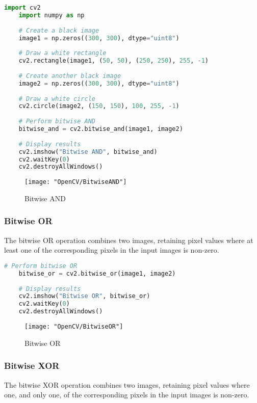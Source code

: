 \begin{lstlisting}[language=Python, caption=Bitwise AND]
	import cv2
	import numpy as np
	
	# Create a black image
	image1 = np.zeros((300, 300), dtype="uint8")
	
	# Draw a white rectangle
	cv2.rectangle(image1, (50, 50), (250, 250), 255, -1)
	
	# Create another black image
	image2 = np.zeros((300, 300), dtype="uint8")
	
	# Draw a white circle
	cv2.circle(image2, (150, 150), 100, 255, -1)
	
	# Perform bitwise AND
	bitwise_and = cv2.bitwise_and(image1, image2)
	
	# Display results
	cv2.imshow("Bitwise AND", bitwise_and)
	cv2.waitKey(0)
	cv2.destroyAllWindows()
\end{lstlisting}


\begin{figure}[h]
	\centering
	\texttt{[image: "OpenCV/BitwiseAND"]}
	\caption{Bitwise AND}\label{Bitwise AND Image}
\end{figure}

\subsubsection{Bitwise OR}
The bitwise OR operation combines two images, retaining pixel values where at least one of the corresponding pixels in the input images is non-zero.

\begin{lstlisting}[language=Python, caption=Bitwise OR]
	# Perform bitwise OR
	bitwise_or = cv2.bitwise_or(image1, image2)
	
	# Display results
	cv2.imshow("Bitwise OR", bitwise_or)
	cv2.waitKey(0)
	cv2.destroyAllWindows()
\end{lstlisting}


\begin{figure}[h]
	\centering
	\texttt{[image: "OpenCV/BitwiseOR"]}
	\caption{Bitwise OR}\label{Bitwise OR Image}
\end{figure}


\subsubsection{Bitwise XOR}
The bitwise XOR operation combines two images, retaining pixel values where one, and only one, of the corresponding pixels in the input images is non-zero.

